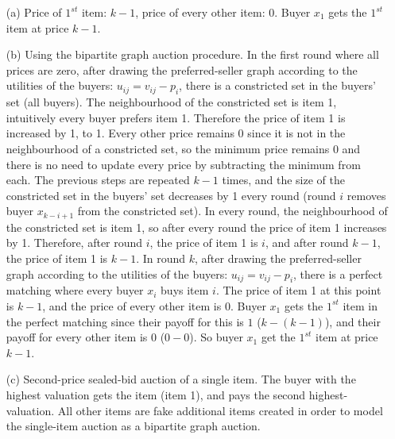 \documentclass{article}
\begin{document}
\begin{enumerate}
	\begin{enumerate}
		\item[(a)] Price of $1^{st}$ item: $k-1$, price of every other item: $0$. Buyer $x_1$ gets the $1^{st}$ item at price $k-1$. 
		\item[(b)] Using the bipartite graph auction procedure. 
		In the first round where all prices are zero, 
		after drawing the preferred-seller graph according to the utilities of the buyers: $u_{ij} = v_{ij} - p_i$, 
		there is a constricted set in the buyers' set (all buyers). 
		The neighbourhood of the constricted set is item 1, intuitively every buyer prefers item 1. 
		Therefore the price of item 1 is increased by 1, to 1. 
		Every other price remains 0 since it is not in the neighbourhood of a constricted set, 
		so the minimum price remains 0 and there is no need to update every price by subtracting the minimum from each. 
		The previous steps are repeated $k-1$ times, and the size of the constricted set in the buyers' set decreases by 1 every round 
		(round $i$ removes buyer $x_{k-i+1}$ from the constricted set). 
		In every round, the neighbourhood of the constricted set is item 1, so after every round the price of item 1 increases by 1. 
		Therefore, after round $i$, the price of item 1 is $i$, and after round $k-1$, the price of item 1 is $k-1$. 
		In round $k$, after drawing the preferred-seller graph according to the utilities of the buyers: $u_{ij} = v_{ij} - p_i$, 
		there is a perfect matching where every buyer $x_i$ buys item $i$. 
		The price of item 1 at this point is $k-1$, and the price of every other item is $0$. 
		Buyer $x_1$ gets the $1^{st}$ item in the perfect matching since their payoff for this is $1$ ($k-(k-1)$), 
		and their payoff for every other item is $0$ ($0-0$). 
		So buyer $x_1$ get the $1^{st}$ item at price $k-1$. 
		\item[(c)] Second-price sealed-bid auction of a single item. 
		The buyer with the highest valuation gets the item (item 1), and pays the second highest-valuation. 
		All other items are fake additional items created in order to model the single-item auction as a bipartite graph auction. 
	\end{enumerate}


\end{enumerate}
\end{document}

